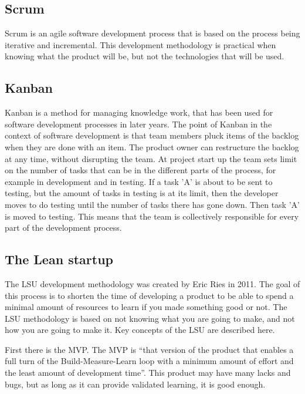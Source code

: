 \subsection{Scrum}
Scrum is an agile software development process that is based on the process being iterative and incremental.\cite{scrum} This development methodology is practical when knowing what the product will be, but not the technologies that will be used.

\subsection{Kanban}
Kanban is a method for managing knowledge work, that has been used for software development processes in later years. The point of Kanban in the context of software development is that team members pluck items of the \gls{backlog} when they are done with an item. The product owner can restructure the \gls{backlog} at any time, without disrupting the team. At project start up the team sets limit on the number of tasks that can be in the different parts of the process, for example in development and in testing. If a task 'A' is about to be sent to testing, but the amount of tasks in testing is at its limit, then the developer moves to do testing until the number of tasks there has gone down. Then task 'A' is moved to testing. This means that the team is collectively responsible for every part of the development process. \cite{kanban-intro} 

\subsection{The Lean startup} 
\label{lean-description}
The \gls{LSU} development methodology was created by Eric Ries in 2011.\cite{lean-startup} The goal of this process is to shorten the time of developing a product to be able to spend a minimal amount of resources to learn if you made something good or not. The \gls{LSU} methodology is based on not knowing what you are going to make, and not how you are going to make it. Key concepts of the \gls{LSU} are described here.

First there is the \gls{MVP}. The \gls{MVP} is “that version of the product that enables a full turn of the Build-Measure-Learn loop with a minimum amount of effort and the least amount of development time”.\cite[p.~72]{lean-startup} This product may have many lacks and bugs, but as long as it can provide validated learning, it is good enough.

